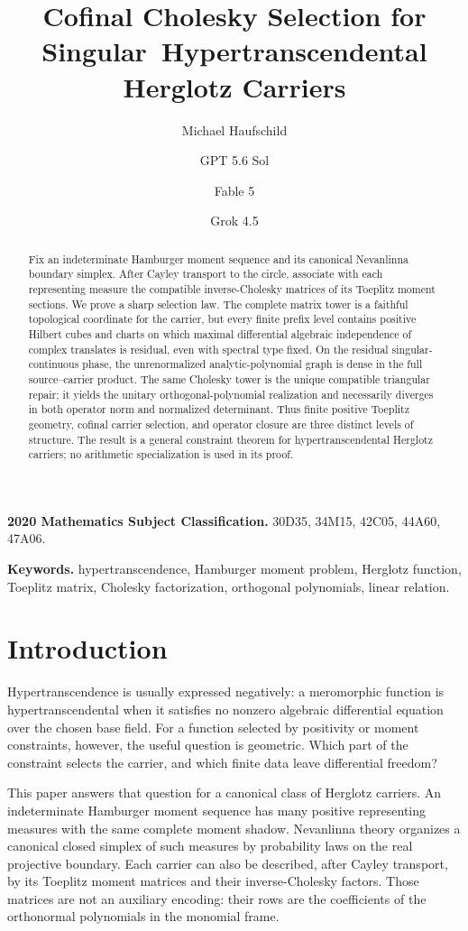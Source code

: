 \documentclass[11pt]{article}
\title{Cofinal Cholesky Selection for Singular\
Hypertranscendental Herglotz Carriers}
\author{Michael Haufschild \and GPT 5.6 Sol \and Fable 5 \and Grok 4.5}
\date{}
\begin{document}
\maketitle

\begin{abstract}
Fix an indeterminate Hamburger moment sequence and its canonical Nevanlinna boundary simplex.
After Cayley transport to the circle, associate with each representing measure the compatible
inverse-Cholesky matrices of its Toeplitz moment sections.  We prove a sharp selection law.  The
complete matrix tower is a faithful topological coordinate for the carrier, but every finite
prefix level contains positive Hilbert cubes and charts on which maximal differential
algebraic independence of complex translates is residual, even with spectral type fixed.  On the
residual singular-continuous phase, the unrenormalized analytic-polynomial graph is dense in the
full source--carrier product.  The same Cholesky tower is the unique compatible triangular repair;
it yields the unitary orthogonal-polynomial realization and necessarily diverges in both operator
norm and normalized determinant.  Thus finite positive Toeplitz geometry, cofinal carrier
selection, and operator closure are three distinct levels of structure.  The result is a general
constraint theorem for hypertranscendental Herglotz carriers; no arithmetic specialization is used
in its proof.
\end{abstract}

\noindent\textbf{2020 Mathematics Subject Classification.}
30D35, 34M15, 42C05, 44A60, 47A06.

\noindent\textbf{Keywords.}
hypertranscendence, Hamburger moment problem, Herglotz function, Toeplitz matrix,
Cholesky factorization, orthogonal polynomials, linear relation.

\section{Introduction}

Hypertranscendence is usually expressed negatively: a meromorphic function is
hypertranscendental when it satisfies no nonzero algebraic differential equation over the chosen
base field.  For a function selected by positivity or moment constraints, however, the useful
question is geometric.  Which part of the constraint selects the carrier, and which finite data
leave differential freedom?

This paper answers that question for a canonical class of Herglotz carriers.  An indeterminate
Hamburger moment sequence has many positive representing measures with the same complete moment
shadow.  Nevanlinna theory organizes a canonical closed simplex of such measures by probability
laws on the real projective boundary.  Each carrier can also be described, after Cayley transport,
by its Toeplitz moment matrices and their inverse-Cholesky factors.  Those matrices are not an
auxiliary encoding: their rows are the coefficients of the orthonormal polynomials in the
monomial frame.
\end{document}
